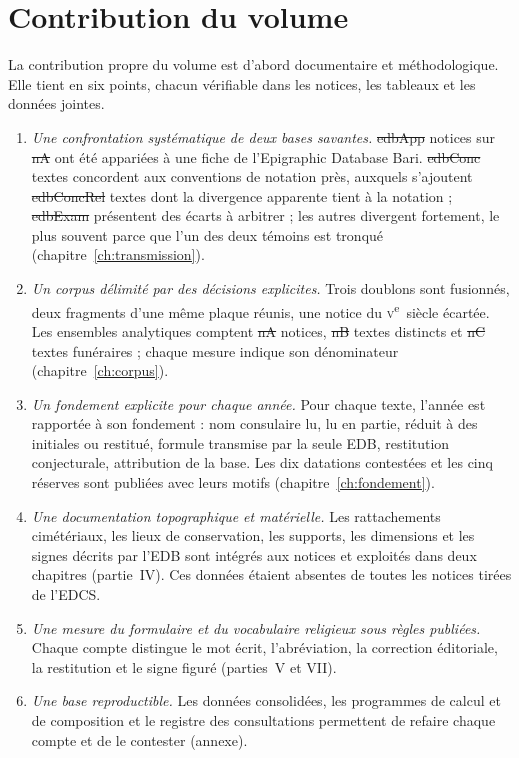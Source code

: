 \section{Contribution du volume}

La contribution propre du volume est d’abord documentaire et méthodologique. Elle tient en six points, chacun vérifiable dans les notices, les tableaux et les données jointes.

\begin{enumerate}[label=(\arabic*),leftmargin=2em]
\item \emph{Une confrontation systématique de deux bases savantes.} \st{edbApp} notices sur \st{nA} ont été appariées à une fiche de l’Epigraphic Database Bari. \st{edbConc} textes concordent aux conventions de notation près, auxquels s’ajoutent \st{edbConcRel} textes dont la divergence apparente tient à la notation ; \st{edbExam} présentent des écarts à arbitrer ; les autres divergent fortement, le plus souvent parce que l’un des deux témoins est tronqué (chapitre~\ref{ch:transmission}).
\item \emph{Un corpus délimité par des décisions explicites.} Trois doublons sont fusionnés, deux fragments d’une même plaque réunis, une notice du \textsc{v}\textsuperscript{e}~siècle écartée. Les ensembles analytiques comptent \st{nA} notices, \st{nB} textes distincts et \st{nC} textes funéraires ; chaque mesure indique son dénominateur (chapitre~\ref{ch:corpus}).
\item \emph{Un fondement explicite pour chaque année.} Pour chaque texte, l’année est rapportée à son fondement : nom consulaire lu, lu en partie, réduit à des initiales ou restitué, formule transmise par la seule EDB, restitution conjecturale, attribution de la base. Les dix datations contestées et les cinq réserves sont publiées avec leurs motifs (chapitre~\ref{ch:fondement}).
\item \emph{Une documentation topographique et matérielle.} Les rattachements cimétériaux, les lieux de conservation, les supports, les dimensions et les signes décrits par l’EDB sont intégrés aux notices et exploités dans deux chapitres (partie~IV). Ces données étaient absentes de toutes les notices tirées de l’EDCS.
\item \emph{Une mesure du formulaire et du vocabulaire religieux sous règles publiées.} Chaque compte distingue le mot écrit, l’abréviation, la correction éditoriale, la restitution et le signe figuré (parties~V et VII).
\item \emph{Une base reproductible.} Les données consolidées, les programmes de calcul et de composition et le registre des consultations permettent de refaire chaque compte et de le contester (annexe).
\end{enumerate}

